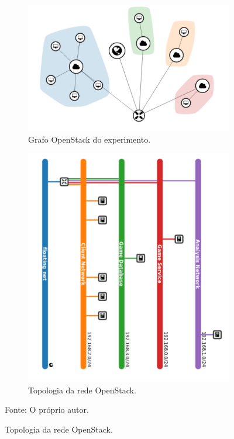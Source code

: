 \begin{figure}[htb!]
    \caption{Topologia da rede no gestor de redes do OpenStack.}
    \centering
    \begin{subfigure}{0.5\textwidth}
      \centering
      \includegraphics[width=.8\textwidth]{img/cap5/topology_graph.png}
      \caption{Grafo OpenStack do experimento.}
      \label{fig:topologia_a}
    \end{subfigure}%
    \begin{subfigure}{0.5\textwidth}
      \centering
      \includegraphics[width=.8\textwidth]{img/cap5/topology.png}
      \caption{Topologia da rede OpenStack.}
      \label{fig:topologia_b}
    \end{subfigure}
    \label{fig:topologia}

    Fonte: O próprio autor.
\end{figure}


